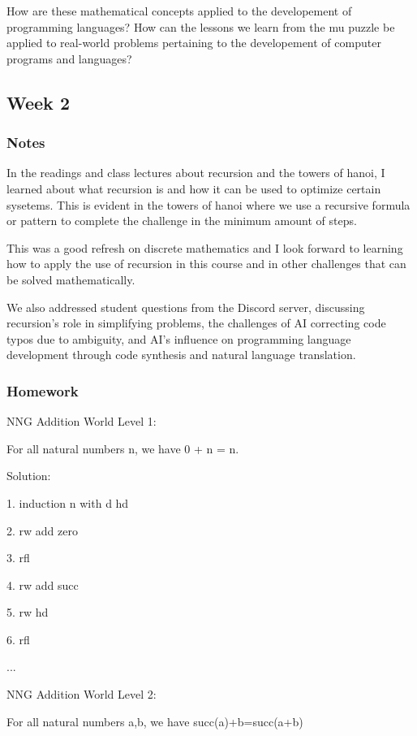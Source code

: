 \documentclass{article}
\theoremstyle{theorem}
\theoremstyle{definition}
\theoremstyle{remark}
\begin{document}
How are these mathematical concepts applied to the developement of programming languages? How can the lessons we learn from the mu puzzle be applied to real-world problems pertaining to the developement of computer programs and languages?


\subsection{Week 2}



\subsubsection*{Notes}

In the readings and class lectures about recursion and the towers of hanoi, I learned about what recursion is and how it can be used to optimize certain sysetems. This is evident in the towers of hanoi where we use a recursive formula or pattern to complete the challenge in the minimum amount of steps.

This was a good refresh on discrete mathematics and I look forward to learning how to apply the use of recursion in this course and in other challenges that can be solved mathematically.

We also addressed student questions from the Discord server, discussing recursion's role in simplifying problems, the challenges of AI correcting code typos due to ambiguity, and AI's influence on programming language development through code synthesis and natural language translation. 

\subsubsection*{Homework}

NNG Addition World Level 1:

For all natural numbers n, we have 0 + n = n.

Solution: 

1. induction n with d hd

2. rw add zero

3. rfl

4. rw add succ

5. rw hd

6. rfl

...

NNG Addition World Level 2:

For all natural numbers a,b, we have succ(a)+b=succ(a+b)
\end{document}
